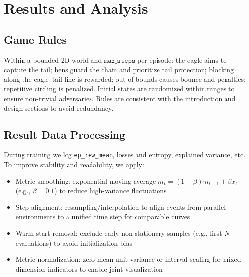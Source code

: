 \documentclass[12pt]{article}
\begin{document}
\section{Results and Analysis}
\subsection{Game Rules}
Within a bounded 2D world and \(\texttt{max\_steps}\) per episode: the eagle aims to capture the tail; hens guard the chain and prioritize tail protection; blocking along the eagle–tail line is rewarded; out-of-bounds causes bounce and penalties; repetitive circling is penalized. Initial states are randomized within ranges to ensure non-trivial adversaries. Rules are consistent with the introduction and design sections to avoid redundancy.
\subsection{Result Data Processing}
During training we log \texttt{ep\_rew\_mean}, losses and entropy, explained variance, etc. To improve stability and readability, we apply:
\begin{itemize}
\item Metric smoothing: exponential moving average \(m_t=(1-\beta) m_{t-1}+\beta x_t\) (e.g., \(\beta=0.1\)) to reduce high-variance fluctuations
\item Step alignment: resampling/interpolation to align events from parallel environments to a unified time step for comparable curves
\item Warm-start removal: exclude early non-stationary samples (e.g., first \(N\) evaluations) to avoid initialization bias
\item Metric normalization: zero-mean unit-variance or interval scaling for mixed-dimension indicators to enable joint visualization
\end{itemize}
\end{document}
